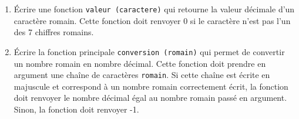 \begin{enumerate}
\item Écrire une fonction \texttt{valeur (caractere)} qui retourne la valeur décimale d'un caractère romain. Cette
fonction doit renvoyer 0 si le caractère n'est pas l'un des 7 chiffres romains.
\item  Écrire la fonction principale \texttt{conversion (romain)} qui permet de convertir un nombre romain en nombre 
décimal. Cette fonction doit prendre en argument une chaîne de caractères \texttt{romain}. Si cette chaîne est 
écrite en majuscule et correspond à un nombre romain correctement écrit, la fonction doit renvoyer le nombre décimal 
égal au nombre romain passé en argument. Sinon, la fonction doit renvoyer -1.
\end{enumerate}
